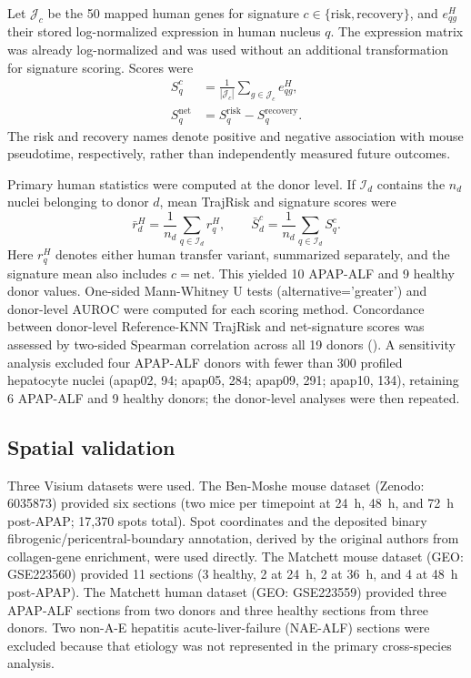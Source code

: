 Let \(\mathcal J_c\) be the 50 mapped human genes for signature \(c\in\{\mathrm{risk},\mathrm{recovery}\}\), and \(e_{qg}^{H}\) their stored log-normalized expression in human nucleus \(q\). The expression matrix was already log-normalized and was used without an additional transformation for signature scoring. Scores were
\begin{equation}\label{eq:signature-scores}
\begin{aligned}
S_q^{c}&=\frac{1}{|\mathcal J_c|}\sum_{g\in\mathcal J_c}e_{qg}^{H},\\
S_q^{\mathrm{net}}&=S_q^{\mathrm{risk}}-S_q^{\mathrm{recovery}}.
\end{aligned}
\end{equation}
The risk and recovery names denote positive and negative association with mouse pseudotime, respectively, rather than independently measured future outcomes.

Primary human statistics were computed at the donor level. If \(\mathcal I_d\) contains the \(n_d\) nuclei belonging to donor \(d\), mean TrajRisk and signature scores were
\begin{equation}\label{eq:donor-scores}
\bar r_d^{H}=\frac{1}{n_d}\sum_{q\in\mathcal I_d}r_q^{H},
\qquad
\bar S_d^{c}=\frac{1}{n_d}\sum_{q\in\mathcal I_d}S_q^{c}.
\end{equation}
Here \(r_q^{H}\) denotes either human transfer variant, summarized separately, and the signature mean also includes \(c=\mathrm{net}\). This yielded 10 APAP-ALF and 9 healthy donor values. One-sided Mann-Whitney U tests (alternative='greater') and donor-level AUROC were computed for each scoring method. Concordance between donor-level Reference-KNN TrajRisk and net-signature scores was assessed by two-sided Spearman correlation across all 19 donors (). A sensitivity analysis excluded four APAP-ALF donors with fewer than 300 profiled hepatocyte nuclei (apap02, 94; apap05, 284; apap09, 291; apap10, 134), retaining 6 APAP-ALF and 9 healthy donors; the donor-level analyses were then repeated.

\subsection*{Spatial validation}

Three Visium datasets were used. The Ben-Moshe mouse dataset (Zenodo: 6035873) \cite{ref011} provided six sections (two mice per timepoint at 24~h, 48~h, and 72~h post-APAP; 17,370 spots total). Spot coordinates and the deposited binary fibrogenic/pericentral-boundary annotation, derived by the original authors from collagen-gene enrichment, were used directly. The Matchett mouse dataset (GEO: GSE223560) \cite{ref019} provided 11 sections (3 healthy, 2 at 24~h, 2 at 36~h, and 4 at 48~h post-APAP). The Matchett human dataset (GEO: GSE223559) \cite{ref019} provided three APAP-ALF sections from two donors and three healthy sections from three donors. Two non-A-E hepatitis acute-liver-failure (NAE-ALF) sections were excluded because that etiology was not represented in the primary cross-species analysis.

